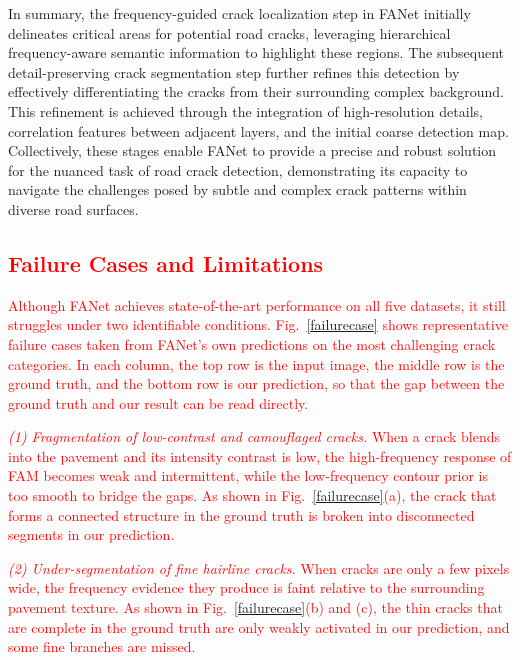 \documentclass[journal]{IEEEtran}
\begin{document}
In summary, the frequency-guided crack localization step in FANet initially delineates critical areas for potential road cracks, leveraging hierarchical frequency-aware semantic information to highlight these regions. The subsequent detail-preserving crack segmentation step further refines this detection by effectively differentiating the cracks from their surrounding complex background. This refinement is achieved through the integration of high-resolution details, correlation features between adjacent layers, and the initial coarse detection map. Collectively, these stages enable FANet to provide a precise and robust solution for the nuanced task of road crack detection, demonstrating its capacity to navigate the challenges posed by subtle and complex crack patterns within diverse road surfaces.


\subsection{\textcolor{red}{Failure Cases and Limitations}}
\textcolor{red}{Although FANet achieves state-of-the-art performance on all five datasets, it still struggles under two identifiable conditions. Fig.~\ref{failurecase} shows representative failure cases taken from FANet's own predictions on the most challenging crack categories. In each column, the top row is the input image, the middle row is the ground truth, and the bottom row is our prediction, so that the gap between the ground truth and our result can be read directly.}

\textcolor{red}{\emph{(1) Fragmentation of low-contrast and camouflaged cracks.} When a crack blends into the pavement and its intensity contrast is low, the high-frequency response of FAM becomes weak and intermittent, while the low-frequency contour prior is too smooth to bridge the gaps. As shown in Fig.~\ref{failurecase}(a), the crack that forms a connected structure in the ground truth is broken into disconnected segments in our prediction.}

\textcolor{red}{\emph{(2) Under-segmentation of fine hairline cracks.} When cracks are only a few pixels wide, the frequency evidence they produce is faint relative to the surrounding pavement texture. As shown in Fig.~\ref{failurecase}(b) and (c), the thin cracks that are complete in the ground truth are only weakly activated in our prediction, and some fine branches are missed.}
\end{document}

